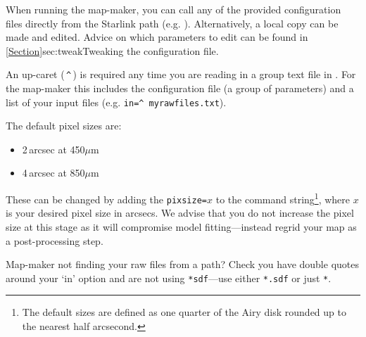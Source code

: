 \documentclass[11pt,oneside,chapters]{starlink}
\begin{document}
When running the map-maker, you can call any of the provided
configuration files directly from the Starlink path (e.g.
). Alternatively,
a local copy can be made and edited. Advice on which parameters to
edit can be found in \cref{Section}{sec:tweak}{Tweaking the
configuration file}.

\begin{tip}
An up-caret (\,\texttt{\^{}}\,) is required any time you are reading in
a  group text file in \starlink. For the map-maker this includes the
configuration file (a group of parameters) and a list of your input files
(e.g. \texttt{in=\^{}\,myrawfiles.txt}).
\end{tip}


The default pixel sizes are:
\begin{itemize}
\item 2\,arcsec at 450$\mu$m
\item 4\,arcsec at 850$\mu$m
\end{itemize}

These can be changed by adding the \texttt{pixsize=}$x$ to the
command string\footnote{The default sizes are defined as one quarter
of the Airy disk rounded up to the nearest half arcsecond.}, where $x$
is your desired pixel size in arcsecs. We advise that you do not
increase the pixel size at this stage as it will compromise model
fitting---instead regrid your map as a post-processing step.


\begin{tip}
Map-maker not finding your raw files from a path? Check you have
double quotes around your `in' option and are not using \texttt{*sdf}---use
either \texttt{*.sdf} or just \texttt{*}.
\end{tip}
\end{document}
